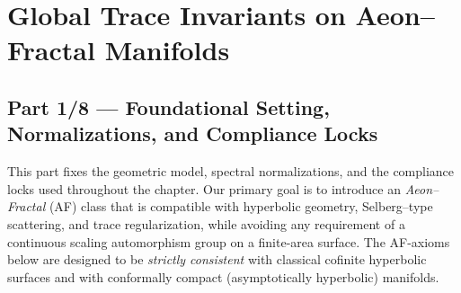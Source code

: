 
\chapter{Global Trace Invariants on Aeon–Fractal Manifolds}
\label{chap:global-trace-invariants-af}
\relax\hspace{0pt}

\section*{Part 1/8 — Foundational Setting, Normalizations, and Compliance Locks}
\relax\hspace{0pt}

\noindent
This part fixes the geometric model, spectral normalizations, and the
compliance locks used throughout the chapter. Our primary goal is to
introduce an \emph{Aeon–Fractal} (AF) class that is compatible with
hyperbolic geometry, Selberg–type scattering, and trace regularization,
while avoiding any requirement of a continuous scaling automorphism
group on a finite-area surface. The AF-axioms below are designed to be
\emph{strictly consistent} with classical cofinite hyperbolic surfaces
and with conformally compact (asymptotically hyperbolic) manifolds.     %

\medskip

